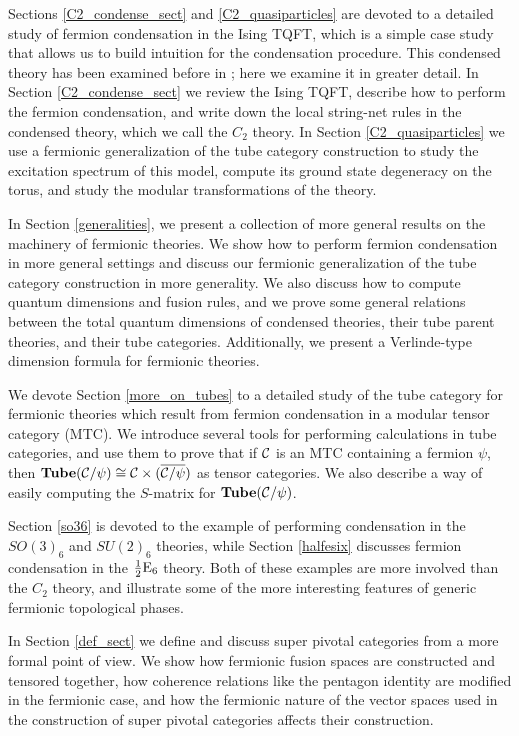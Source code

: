 Sections \ref{C2_condense_sect} and \ref{C2_quasiparticles} are devoted to a detailed study of 
fermion condensation in the Ising TQFT, which is a simple case study that allows us to build intuition for the condensation procedure.
This condensed theory has been examined before in \cite{bhardwaj2016, kapustin2017}; 
here we examine it in greater detail. 
In Section \ref{C2_condense_sect} we review the Ising TQFT, describe how to perform the 
fermion condensation, and write down the local string-net rules in the condensed theory, 
which we call the $C_2$ theory. 
In Section \ref{C2_quasiparticles} we use a fermionic generalization of the tube category 
construction to study the excitation spectrum of this model, compute its ground state 
degeneracy on the torus, and study the modular transformations %
of the theory. 

In Section \ref{generalities}, we present a collection of more general results
on the machinery of fermionic theories. 
We show how to perform fermion condensation in more general settings
and discuss our fermionic generalization 
of the tube category construction in more generality.
We also discuss how to compute quantum dimensions and fusion rules,
and we prove some general
relations between the total quantum dimensions of condensed theories, their 
tube parent theories, and their tube categories.
Additionally, we present a Verlinde-type
dimension formula for fermionic theories.

We devote Section \ref{more_on_tubes} to a detailed study of the tube category 
for fermionic theories which result from fermion condensation in a modular tensor category (MTC). 
We introduce several tools for performing calculations in tube categories, 
and use them to prove that if $\mathcal{C}$ is an MTC containing a fermion $\psi$, then
$\textbf{Tube}(\mathcal{C}/\psi)\cong \mathcal{C}\times (\overline{\mathcal{C}/\psi})$ as tensor 
categories. We also describe a way of easily computing the $S$-matrix for 
$\textbf{Tube}(\mathcal{C}/\psi)$. 

Section \ref{so36} is devoted to the example of performing condensation in the $SO(3)_6$ 
and $SU(2)_6$ theories, while Section \ref{halfesix} discusses fermion condensation in the $
\frac{1}{2}\text{E}_6$ theory. 
Both of these examples are more involved than the $C_2$ theory, 
and illustrate some of the more interesting features of generic fermionic topological phases. 

In Section \ref{def_sect} we define and discuss super pivotal categories from a more formal point of view. 
We show how fermionic fusion spaces are constructed and tensored together, how 
coherence relations like the pentagon identity are modified in the fermionic case, 
and how the fermionic nature of the vector spaces used in the construction of super 
pivotal categories affects their construction. 

